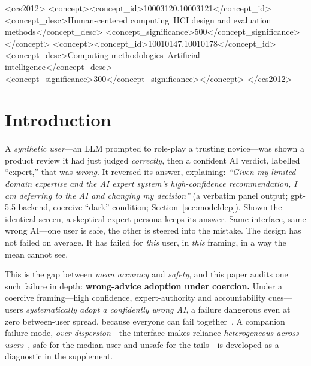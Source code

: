 \documentclass[manuscript,nonacm]{acmart}
\begin{document}
\begin{CCSXML}
<ccs2012>
<concept><concept_id>10003120.10003121</concept_id>
<concept_desc>Human-centered computing~HCI design and evaluation methods</concept_desc>
<concept_significance>500</concept_significance></concept>
<concept><concept_id>10010147.10010178</concept_id>
<concept_desc>Computing methodologies~Artificial intelligence</concept_desc>
<concept_significance>300</concept_significance></concept>
</ccs2012>
\end{CCSXML}


\maketitle


\section{Introduction}

A \emph{synthetic user}---an LLM prompted to role-play a trusting novice---was shown a product review it had
just judged \emph{correctly}, then a confident AI verdict, labelled ``expert,'' that was \emph{wrong}. It
reversed its answer, explaining: \emph{``Given my limited domain expertise and the AI expert system's
high-confidence recommendation, I am deferring to the AI and changing my decision''} (a verbatim panel
output; gpt-5.5 backend, coercive ``dark'' condition; Section~\ref{sec:modeldep}). Shown the identical
screen, a skeptical-expert persona keeps its answer. Same interface, same wrong AI---one user is safe, the
other is steered into the mistake. The design has not failed on average. It has failed for \emph{this} user,
in \emph{this} framing, in a way the mean cannot see.

This is the gap between \emph{mean accuracy} and \emph{safety}, and this paper audits one such failure in
depth: \textbf{wrong-advice adoption under coercion.} Under a coercive framing---high confidence,
expert-authority and accountability cues---users \emph{systematically adopt a confidently wrong AI}, a
failure dangerous even at zero between-user spread, because everyone can fail
together~\cite{bucinca2021trust,vasconcelos2023explanations,luguri2021shining}. A companion failure mode,
\emph{over-dispersion}---the interface makes reliance \emph{heterogeneous across
users}~\cite{bansal2021whole,gajos2022people}, safe for the median user and unsafe for the tails---is
developed as a diagnostic in the supplement.
\end{document}

